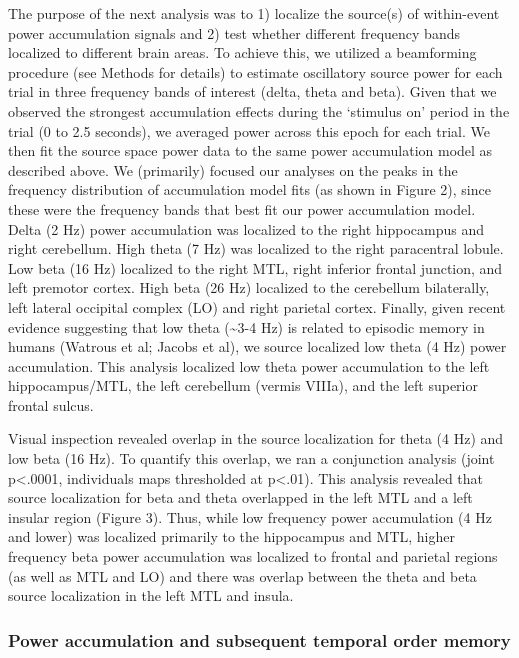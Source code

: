 The purpose of the next analysis was to 1) localize the source(s) of
within-event power accumulation signals and 2) test whether different
frequency bands localized to different brain areas. To achieve this, we
utilized a beamforming procedure (see Methods for details) to estimate
oscillatory source power for each trial in three frequency bands of
interest (delta, theta and beta). Given that we observed the strongest
accumulation effects during the `stimulus on' period in the trial (0 to
2.5 seconds), we averaged power across this epoch for each trial. We
then fit the source space power data to the same power accumulation
model as described above. We (primarily) focused our analyses on the
peaks in the frequency distribution of accumulation model fits (as shown
in Figure 2), since these were the frequency bands that best fit our
power accumulation model. Delta (2 Hz) power accumulation was localized
to the right hippocampus and right cerebellum. High theta (7 Hz) was
localized to the right paracentral lobule. Low beta (16 Hz) localized to
the right MTL, right inferior frontal junction, and left premotor
cortex. High beta (26 Hz) localized to the cerebellum bilaterally, left
lateral occipital complex (LO) and right parietal cortex. Finally, given
recent evidence suggesting that low theta (\textasciitilde{}3-4 Hz) is
related to episodic memory in humans (Watrous et al; Jacobs et al), we
source localized low theta (4 Hz) power accumulation. This analysis
localized low theta power accumulation to the left hippocampus/MTL, the
left cerebellum (vermis VIIIa), and the left superior frontal sulcus.

Visual inspection revealed overlap in the source localization for theta
(4 Hz) and low beta (16 Hz). To quantify this overlap, we ran a
conjunction analysis (joint p\textless{}.0001, individuals maps
thresholded at p\textless{}.01). This analysis revealed that source
localization for beta and theta overlapped in the left MTL and a left
insular region (Figure 3). Thus, while low frequency power accumulation
(4 Hz and lower) was localized primarily to the hippocampus and MTL,
higher frequency beta power accumulation was localized to frontal and
parietal regions (as well as MTL and LO) and there was overlap between
the theta and beta source localization in the left MTL and insula.

\subsubsection{Power accumulation and subsequent temporal order
memory}\label{power-accumulation-and-subsequent-temporal-order-memory}

